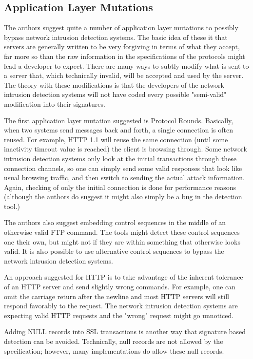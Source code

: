 \documentclass{reading_glasses}
\begin{document}
\subsection{Application Layer Mutations}
The authors suggest quite a number of application layer mutations to possibly bypass network intrusion detection systems.  The basic idea of these it that servers are generally written to be very forgiving in terms of what they accept, far more so than the raw information in the specifications of the protocols might lead a developer to expect.  There are many ways to subtly modify what is sent to a server that, which technically invalid, will be accepted and used by the server.  The theory with these modifications is that the developers of the network intrusion detection systems will not have coded every possible "semi-valid" modification into their signatures. \cite{vigna2004testing}

The first application layer mutation suggested is Protocol Rounds.  Basically, when two systems send messages back and forth, a single connection is often reused.  For example, HTTP 1.1 will reuse the same connection (until some inactivity timeout value is reached) the client is browsing through.  Some network intrusion detection systems only look at the initial transactions through these connection channels, so one can simply send some valid responses that look like usual browsing traffic, and then switch to sending the actual attack information.  Again, checking of only the initial connection is done for performance reasons (although the authors do suggest it might also simply be a bug in the detection tool.) \cite{vigna2004testing}

The authors also suggest embedding control sequences in the middle of an otherwise valid FTP command.  The tools might detect these control sequences one their own, but might not if they are within something that otherwise looks valid.  It is also possible to use alternative control sequences to bypass the network intrusion detection systems.  \cite{vigna2004testing}

An approach suggested for HTTP is to take advantage of the inherent tolerance of an HTTP server and send slightly wrong commands.  For example, one can omit the carriage return after the newline and most HTTP servers will still respond favorably to the request.  The network intrusion detection systems are expecting valid HTTP requests and the "wrong" request might go unnoticed.  \cite{vigna2004testing}

Adding NULL records into SSL transactions is another way that signature based detection can be avoided.  Technically, null records are not allowed by the specification; however, many implementations do allow these null records. \cite{vigna2004testing}
\end{document}
